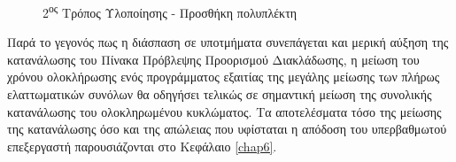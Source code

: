 \begin{figure}[t]
    \centering
    \caption{2\textsuperscript{ος} Τρόπος Υλοποίησης - Προσθήκη πολυπλέκτη}
    \label{fig:chap5_permutation_impl_v2}
\end{figure}

Παρά το γεγονός πως η διάσπαση σε υποτμήματα συνεπάγεται και μερική αύξηση της κατανάλωσης του Πίνακα Πρόβλεψης Προορισμού Διακλάδωσης, η μείωση του χρόνου ολοκλήρωσης ενός προγράμματος εξαιτίας της μεγάλης μείωσης των πλήρως ελαττωματικών συνόλων θα οδηγήσει τελικώς σε σημαντική μείωση της συνολικής κατανάλωσης του ολοκληρωμένου κυκλώματος. Τα αποτελέσματα τόσο της μείωσης της κατανάλωσης όσο και της απώλειας που υφίσταται η απόδοση του υπερβαθμωτού επεξεργαστή παρουσιάζονται στο Κεφάλαιο \ref{chap6}.


